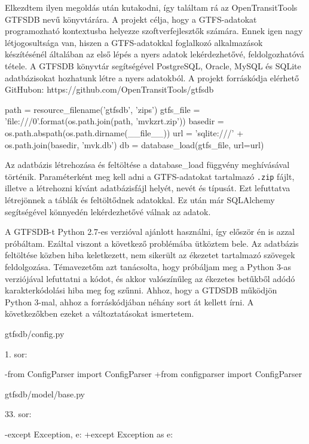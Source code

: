 Elkezdtem ilyen megoldás után kutakodni, így találtam rá az OpenTransitTools GTFSDB nevű könyvtárára. A projekt célja, hogy a GTFS-adatokat programozható kontextusba helyezze szoftverfejlesztők számára. Ennek igen nagy létjogosultsága van, hiszen a GTFS-adatokkal foglalkozó alkalmazások készítésénél általában az első lépés a nyers adatok lekérdezhetővé, feldolgozhatóvá tétele. A GTFSDB könyvtár segítségével PostgreSQL, Oracle, MySQL és SQLite adatbázisokat hozhatunk létre a nyers adatokból. A projekt forráskódja elérhető GitHubon: https://github.com/OpenTransitTools/gtfsdb

\begin{python}
path = resource_filename('gtfsdb', 'zips')
gtfs_file = 'file:///{0}'.format(os.path.join(path, 'mvkzrt.zip'))
basedir = os.path.abspath(os.path.dirname(__file__))
url = 'sqlite:///' + os.path.join(basedir, 'mvk.db')
db = database_load(gtfs_file, url=url)
\end{python}

Az adatbázis létrehozása és feltöltése a database\_load függvény meghívásával történik. Paraméterként meg kell adni a GTFS-adatokat tartalmazó \texttt{.zip} fájlt, illetve a létrehozni kívánt adatbázisfájl helyét, nevét és típusát. Ezt lefuttatva létrejönnek a táblák és feltöltődnek adatokkal. Ez után már SQLAlchemy segítségével könnyedén lekérdezhetővé válnak az adatok.

A GTFSDB-t Python 2.7-es verzióval ajánlott használni, így először én is azzal próbáltam. Ezáltal viszont a következő problémába ütköztem bele. Az adatbázis feltöltése közben hiba keletkezett, nem sikerült az ékezetet tartalmazó szövegek feldolgozása. Témavezetőm azt tanácsolta, hogy próbáljam meg a Python 3-as verziójával lefuttatni a kódot, és akkor valószínűleg az ékezetes betűkből adódó karakterkódolási hiba meg fog szűnni. Ahhoz, hogy a GTDSDB működjön Python 3-mal, ahhoz a forráskódjában néhány sort át kellett írni. A következőkben ezeket a változtatásokat ismertetem.

gtfsdb/config.py

1. sor:
\begin{python}
-from ConfigParser import ConfigParser
+from configparser import ConfigParser
\end{python}

gtfsdb/model/base.py

33. sor:
\begin{python}
-except Exception, e:
+except Exception as e: 
\end{python}

